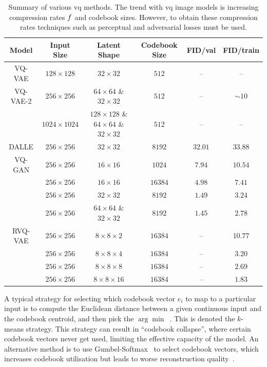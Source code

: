 \begin{table}[ht]
    \centering
    \begin{tabular}{|c|c|c|c|c|c|}
        \hline
        \textbf{Model} & \textbf{Input Size} & \textbf{Latent Shape} & \textbf{Codebook Size} & \textbf{FID/val} & \textbf{FID/train} \\
        \hline
        VQ-VAE & $128 \times 128$ & $32 \times 32$ & $512$ & -- & -- \\
        \hline
        VQ-VAE-2 & $256 \times 256$ & $64 \times 64$ \& $32 \times 32$ & $512$ & --& $\sim 10$ \\
                 & $1024 \times 1024$ & $128 \times 128$ \& $64 \times 64$ \& $32 \times 32$ & $512$ & -- & -- \\
        \hline
        DALLE & $256 \times 256$ & $32 \times 32$ & $8192$ & $32.01$ & $33.88$ \\
        \hline
        VQ-GAN & $256 \times 256$ & $16 \times 16$ & $1024$ & $7.94$ & $10.54$ \\
        & $256 \times 256$ & $16 \times 16$ & $16384$ & $4.98$ & $7.41$ \\
        & $256 \times 256$ & $32 \times 32$ & $8192$ & $1.49$ & $3.24$ \\
        & $256 \times 256$ & $64 \times 64$ \& $32 \times 32$ & $8192$ & $1.45$ & $2.78$ \\
        \hline
        RVQ-VAE & $256 \times 256$ & $8 \times 8 \times 2$ & $16384$ & -- & $10.77$ \\
        & $256 \times 256$ & $8 \times 8 \times 4$ & $16384$ & -- & $3.20$ \\
        & $256 \times 256$ & $8 \times 8 \times 8$ & $16384$ & -- & $2.69$ \\
        & $256 \times 256$ & $8 \times 8 \times 16$ & $16384$ & -- & $1.83$ \\
        \hline
    \end{tabular}
    \caption[Table]{Summary of various \acrfull{vq} methods. The trend with
    \gls{vq} image models is increasing compression rates $f$ and
    codebook sizes. However, to obtain these compression rates techniques such
    as perceptual and adversarial losses must be used.}
    \label{tab:vq}
\end{table}

A typical strategy for selecting which codebook vector $e_i$ to map to a
particular input is to compute the Euclidean distance between a given continuous
input and the codebook centroid, and then pick the
$\arg\min$~\cite{oord2017vqvae}. This is denoted the $k$-means strategy. This
strategy can result in ``codebook collapse'', where certain codebook vectors
never get used, limiting the effective capacity of the model. An alternative
method is to use Gumbel-Softmax~\cite{jang2016gumbel} to select codebook
vectors, which increases codebook utilisation but leads to worse
reconstruction quality~\cite{bondtaylor2021unleashing}.

